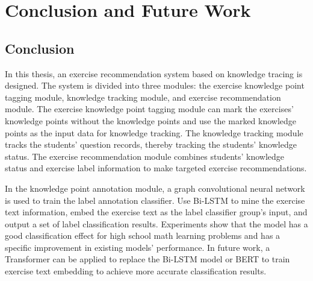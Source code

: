 \chapter{Conclusion and Future Work}
\section{Conclusion}
In this thesis, an exercise recommendation system based on knowledge tracing is designed. The system is divided into three modules: the exercise knowledge point tagging module, knowledge tracking module, and exercise recommendation module. The exercise knowledge point tagging module can mark the exercises' knowledge points without the knowledge points and use the marked knowledge points as the input data for knowledge tracking. The knowledge tracking module tracks the students' question records, thereby tracking the students' knowledge status. The exercise recommendation module combines students' knowledge status and exercise label information to make targeted exercise recommendations.


In the knowledge point annotation module, a graph convolutional neural network is used to train the label annotation classifier. Use Bi-LSTM to mine the exercise text information, embed the exercise text as the label classifier group's input, and output a set of label classification results. Experiments show that the model has a good classification effect for high school math learning problems and has a specific improvement in existing models' performance. In future work, a Transformer can be applied to replace the Bi-LSTM model or BERT to train exercise text embedding to achieve more accurate classification results.

